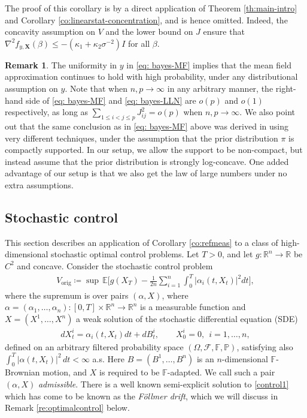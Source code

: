 \documentclass[11pt,reqno]{amsart}
\numberwithin{equation}{section}
\theoremstyle{definition}
\newtheorem{remark}[theorem]{Remark}
\def\E{{\mathbb E}}
\def\R{{\mathbb R}}
\def\PP{{\mathbb P}}
\def\FF{{\mathbb F}}
\def\F{{\mathcal F}}
\begin{document}
The proof of this corollary is by a direct application of  Theorem \ref{th:main-intro} and Corollary \ref{co:linearstat-concentration}, and is hence omitted. Indeed, the concavity assumption on $V$ and the lower bound on $J$ ensure that $\nabla^2 f_{y,\mathbf{X}}(\beta) \le -( \kappa_1+\kappa_2\sigma^{-2})I$ for all $\beta$.


\begin{remark}
	The uniformity in $y$ in \eqref{eq: bayes-MF} implies that the mean field approximation continues to hold with high probability, under any distributional assumption on $y$. Note that when $ n,p \to \infty $ in any arbitrary manner, the right-hand side of  \eqref{eq: bayes-MF} and \eqref{eq: bayes-LLN} are $ o(p) $ and $ o(1) $ respectively, as long as $ \sum_{1 \le i < j \le p} J_{ij}^2 = o(p)$ when $ n,p \to \infty$. We also point out that the same conclusion as in \eqref{eq: bayes-MF} above was derived in \cite[Theorem 1]{mukherjee2021variational} using very different techniques, under the assumption that the prior distribution $\pi$ is compactly supported. In our setup, we allow the support to be non-compact, but instead assume that the prior distribution is strongly log-concave. One added advantage of our setup is that we also get the law of large numbers under no extra assumptions. 
\end{remark}



\subsection{Stochastic control} \label{se:control}


This section describes an application of Corollary \ref{co:refmeas} to a class of high-dimensional stochastic optimal control problems. Let $T > 0$, and let $g : \R^n \to \R$ be $C^2$ and concave. Consider the stochastic control problem
\begin{align}
	V_{\mathrm{orig}} \coloneqq \sup\,  \E\Bigg[ g(X_T) -  \frac{1}{2n} \sum_{i=1}^n \int_0^T |\alpha_i(t,X_t)|^2dt\Bigg], \label{control1}
\end{align}
where the supremum is over pairs $(\alpha,X)$, where  $\alpha=(\alpha_1,\ldots,\alpha_n) : [0,T] \times \R^n \to \R^n$ is a  measurable function and $X=(X^1,\ldots,X^n)$ a weak solution of the stochastic differential equation (SDE)
\begin{align}
	dX^i_t = \alpha_i(t,X_t)dt + dB^i_t, \qquad X^i_0=0, \ \ i=1,\ldots,n, \label{SDE}
\end{align}
defined on an arbitrary filtered probability space $(\Omega,\F,\FF,\PP)$,
satisfying also  $\int_0^T |\alpha(t,X_t)|^2  \,dt < \infty$ a.s.
Here $B=(B^1,\ldots,B^n)$ is an $n$-dimensional $\FF$-Brownian motion, and $X$ is required to be $\FF$-adapted. 
We call such a pair $(\alpha,X)$ \emph{admissible}.
There is a well known semi-explicit solution to \eqref{control1} which has come to be known as the \emph{F\"ollmer drift}, which we will discuss in Remark \ref{re:optimalcontrol} below.
\end{document}

